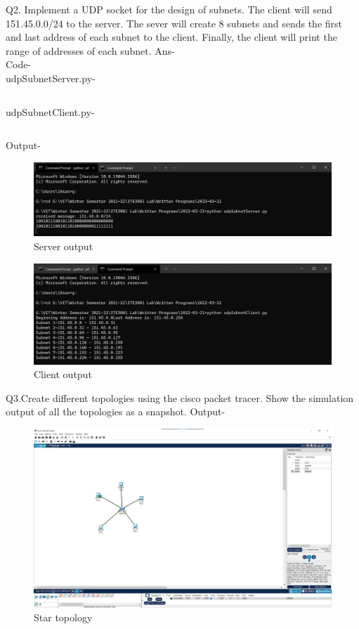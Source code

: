 \documentclass[12pt]{article}
\begin{document}
Q2. Implement a UDP socket for the design of subnets. The client will send 151.45.0.0/24 to the server. The sever will create 8 subnets and sends the first and last address of each subnet to the client. Finally, the client will print the range of addresses of each subnet.
\newline
Ans- \\ Code- \\ udpSubnetServer.py-\inputminted{python}{udpSubnetServer.py}
udpSubnetClient.py- \inputminted{python}{udpSubnetClient.py}
Output-
\begin{figure}[h] %
\centering
\includegraphics[width=\textwidth]{udpSubnetServer.py.png}
\caption{Server output}
\end{figure}
\begin{figure}[h] %
\centering
\includegraphics[width=\textwidth]{udpSubnetClient.py.png}
\caption{Client output}
\end{figure}
\newpage
\newpage
Q3.Create different topologies using the cisco packet tracer. Show the simulation output of all the topologies as a snapshot.
Output-
\begin{figure}[h] %
\centering
\includegraphics[width=\textwidth]{star.png}
\caption{Star topology}
\end{figure}
\end{document}
